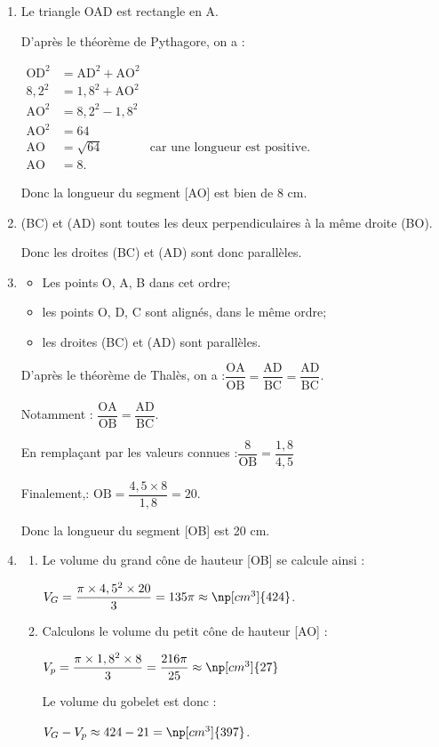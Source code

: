 \begin{enumerate}
	\item Le triangle OAD est rectangle en A.

	D'après le théorème de Pythagore, on a :

	$\begin{aligned}
	\mathrm{OD}^2&=\mathrm{AD}^2+\mathrm{AO}^2\\
	8,2^2&=1,8^2+\mathrm{AO}^2\\
	\mathrm{AO}^2&=8,2^2-1,8^2\\
	\mathrm{AO}^2&=64\\
	\mathrm{AO}&=\sqrt{64}& \text{car une longueur est positive.}\\
	\mathrm{AO}&=8.
	\end{aligned}$

	Donc la longueur du segment [AO] est bien de 8 cm.

	\item (BC) et (AD) sont toutes les deux perpendiculaires à la même droite (BO).

	Donc les droites (BC) et (AD) sont donc parallèles.

	\item \begin{itemize}
		\item Les points O, A, B dans cet ordre;
		\item les points O, D, C sont alignés, dans le même ordre;
		\item les droites (BC) et (AD) sont parallèles.
	\end{itemize}

	D'après le théorème de Thalès, on a :\quad $\dfrac{\mathrm{OA}}{\mathrm{OB}}=\dfrac{\mathrm{AD}}{\mathrm{BC}}=\dfrac{\mathrm{AD}}{\mathrm{BC}}$.

	Notamment : \quad $\dfrac{\mathrm{OA}}{\mathrm{OB}}=\dfrac{\mathrm{AD}}{\mathrm{BC}}$.

	En remplaçant par les valeurs connues :\quad $\dfrac{8}{\mathrm{OB}}=\dfrac{1,8}{4,5}$

	Finalement,\quad : $\mathrm{OB}=\dfrac{4,5\times 8}{1,8} =20$.

	Donc la longueur du segment [OB] est 20 cm.

	\item \begin{enumerate}
		\item Le volume du grand cône de hauteur [OB] se calcule ainsi :

		$V_G=\dfrac{\pi \times 4,5^2\times 20}{3}=135\pi\approx \np[cm^3]{424}$.

		\item Calculons le volume du petit cône de hauteur [AO] :

		$V_p=\dfrac{\pi \times 1,8^2\times 8}{3}=\dfrac{216\pi}{25}\approx \np[cm^3]{27}$

		Le volume du gobelet est donc :

		$V_G-V_p\approx 424-21=\np[cm^3]{397}$.
	\end{enumerate}
\end{enumerate}
